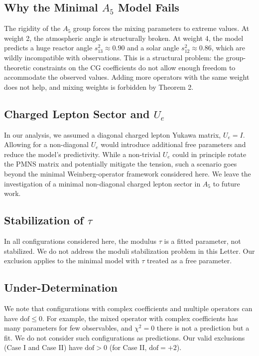 \documentclass[11pt, a4paper]{article}
\begin{document}
\subsection{Why the Minimal \(A_5\) Model Fails}
The rigidity of the \(A_5\) group forces the mixing parameters to extreme values. At weight 2, the atmospheric angle is structurally broken. At weight 4, the model predicts a huge reactor angle \(s_{13}^2 \approx 0.90\) and a solar angle \(s_{12}^2 \approx 0.86\), which are wildly incompatible with observations. This is a structural problem: the group-theoretic constraints on the CG coefficients do not allow enough freedom to accommodate the observed values. Adding more operators with the same weight does not help, and mixing weights is forbidden by Theorem 2.

\subsection{Charged Lepton Sector and \(U_e\)}
In our analysis, we assumed a diagonal charged lepton Yukawa matrix, \(U_e = I\). Allowing for a non-diagonal \(U_e\) would introduce additional free parameters and reduce the model's predictivity. While a non-trivial \(U_e\) could in principle rotate the PMNS matrix and potentially mitigate the tension, such a scenario goes beyond the minimal Weinberg-operator framework considered here. We leave the investigation of a minimal non-diagonal charged lepton sector in \(A_5\) to future work.

\subsection{Stabilization of \(\tau\)}
In all configurations considered here, the modulus \(\tau\) is a fitted parameter, not stabilized. We do not address the moduli stabilization problem in this Letter. Our exclusion applies to the minimal model with \(\tau\) treated as a free parameter. 

\subsection{Under-Determination}
We note that configurations with complex coefficients and multiple operators can have \(\mathrm{dof} \le 0\). For example, the mixed operator with complex coefficients has many parameters for few observables, and \(\chi^2 = 0\) there is not a prediction but a fit. We do not consider such configurations as predictions. Our valid exclusions (Case I and Case II) have \(\mathrm{dof} > 0\) (for Case II, \(\mathrm{dof} = +2\)).
\end{document}

